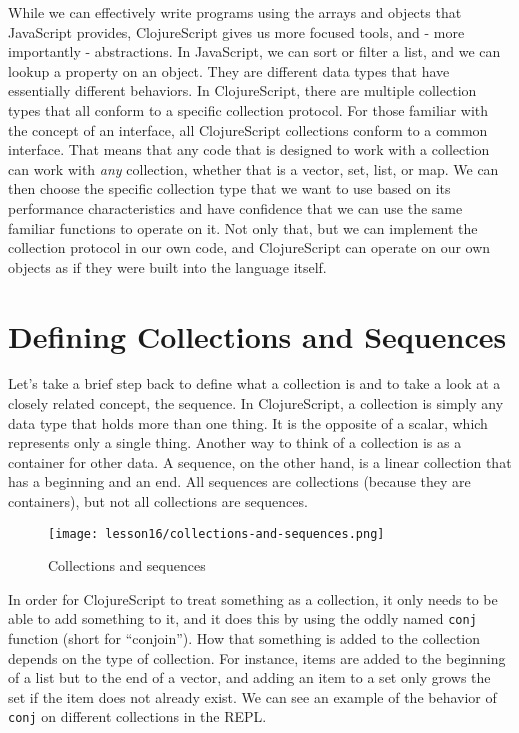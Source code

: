 \documentclass[10pt,twoside,openright]{memoir}
\begin{document}
While we can effectively write programs using the arrays and objects
that JavaScript provides, ClojureScript gives us more focused tools, and
- more importantly - abstractions. In JavaScript, we can sort or filter
a list, and we can lookup a property on an object. They are different
data types that have essentially different behaviors. In ClojureScript,
there are multiple collection types that all conform to a specific
collection protocol. For those familiar with the concept of an
interface, all ClojureScript collections conform to a common interface.
That means that any code that is designed to work with a collection can
work with \emph{any} collection, whether that is a vector, set, list, or
map. We can then choose the specific collection type that we want to use
based on its performance characteristics and have confidence that we can
use the same familiar functions to operate on it. Not only that, but we
can implement the collection protocol in our own code, and ClojureScript
can operate on our own objects as if they were built into the language
itself.


\section{Defining Collections and Sequences}

Let's take a brief step back to define what a collection is and to take
a look at a closely related concept, the sequence. In ClojureScript, a
collection is simply any data type that holds more than one thing. It is
the opposite of a scalar, which represents only a single thing. Another
way to think of a collection is as a container for other data. A
sequence, on the other hand, is a linear collection that has a beginning
and an end. All sequences are collections (because they are containers),
but not all collections are sequences.

\begin{figure}[H]
\caption{Collections and sequences}
\centering
\texttt{[image: lesson16/collections-and-sequences.png]}
\end{figure}

In order for ClojureScript to treat something as a collection, it only
needs to be able to add something to it, and it does this by using the
oddly named \texttt{conj} function (short for ``conjoin''). How that
something is added to the collection depends on the type of collection.
For instance, items are added to the beginning of a list but to the end
of a vector, and adding an item to a set only grows the set if the item
does not already exist. We can see an example of the behavior of
\texttt{conj} on different collections in the REPL.
\end{document}
